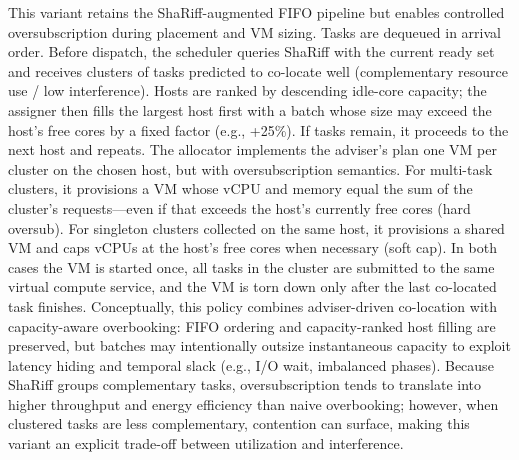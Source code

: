 This variant retains the ShaRiff-augmented FIFO pipeline but enables controlled oversubscription during placement and VM sizing. Tasks are dequeued in arrival order. Before dispatch, the scheduler queries ShaRiff with the current ready set and receives clusters of tasks predicted to co-locate well (complementary resource use / low interference). Hosts are ranked by descending idle-core capacity; the assigner then fills the largest host first with a batch whose size may exceed the host’s free cores by a fixed factor (e.g., +25\%). If tasks remain, it proceeds to the next host and repeats.
The allocator implements the adviser’s plan one VM per cluster on the chosen host, but with oversubscription semantics. For multi-task clusters, it provisions a VM whose vCPU and memory equal the sum of the cluster’s requests—even if that exceeds the host’s currently free cores (hard oversub). For singleton clusters collected on the same host, it provisions a shared VM and caps vCPUs at the host’s free cores when necessary (soft cap). In both cases the VM is started once, all tasks in the cluster are submitted to the same virtual compute service, and the VM is torn down only after the last co-located task finishes.
Conceptually, this policy combines adviser-driven co-location with capacity-aware overbooking: FIFO ordering and capacity-ranked host filling are preserved, but batches may intentionally outsize instantaneous capacity to exploit latency hiding and temporal slack (e.g., I/O wait, imbalanced phases). Because ShaRiff groups complementary tasks, oversubscription tends to translate into higher throughput and energy efficiency than naive overbooking; however, when clustered tasks are less complementary, contention can surface, making this variant an explicit trade-off between utilization and interference.


